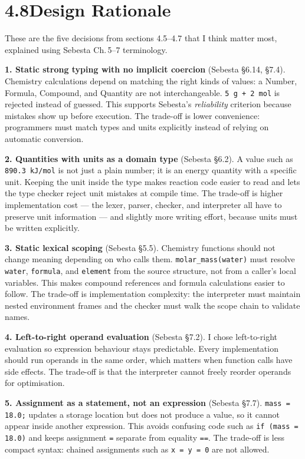 \documentclass[11pt,a4paper]{article}
\newcommand{\code}[1]{\texttt{#1}}
\begin{document}
\section{4.8\quad Design Rationale}

These are the five decisions from sections 4.5--4.7 that I think matter most, explained using Sebesta Ch.\,5--7 terminology.

\textbf{1. Static strong typing with no implicit coercion} (Sebesta \S6.14, \S7.4). Chemistry calculations depend on matching the right kinds of values: a Number, Formula, Compound, and Quantity are not interchangeable. \code{5 g + 2 mol} is rejected instead of guessed. This supports Sebesta's \emph{reliability} criterion because mistakes show up before execution. The trade-off is lower convenience: programmers must match types and units explicitly instead of relying on automatic conversion.

\textbf{2. Quantities with units as a domain type} (Sebesta \S6.2). A value such as \code{890.3 kJ/mol} is not just a plain number; it is an energy quantity with a specific unit. Keeping the unit inside the type makes reaction code easier to read and lets the type checker reject unit mistakes at compile time. The trade-off is higher implementation cost --- the lexer, parser, checker, and interpreter all have to preserve unit information --- and slightly more writing effort, because units must be written explicitly.

\textbf{3. Static lexical scoping} (Sebesta \S5.5). Chemistry functions should not change meaning depending on who calls them. \code{molar\_mass(water)} must resolve \code{water}, \code{formula}, and \code{element} from the source structure, not from a caller's local variables. This makes compound references and formula calculations easier to follow. The trade-off is implementation complexity: the interpreter must maintain nested environment frames and the checker must walk the scope chain to validate names.

\textbf{4. Left-to-right operand evaluation} (Sebesta \S7.2). I chose left-to-right evaluation so expression behaviour stays predictable. Every implementation should run operands in the same order, which matters when function calls have side effects. The trade-off is that the interpreter cannot freely reorder operands for optimisation.

\textbf{5. Assignment as a statement, not an expression} (Sebesta \S7.7). \code{mass = 18.0;} updates a storage location but does not produce a value, so it cannot appear inside another expression. This avoids confusing code such as \code{if (mass = 18.0)} and keeps assignment \code{=} separate from equality \code{==}. The trade-off is less compact syntax: chained assignments such as \code{x = y = 0} are not allowed.
\end{document}
